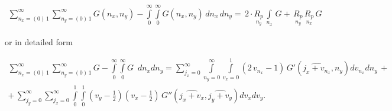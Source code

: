 \documentclass[twoside, 10pt]{article}
\begin{document}
    \begin{equation}
\begin{array}{r}
\sum\limits_{n_x=\left(0\right)\,1}^{\infty}
\sum\limits_{n_y=\left(0\right)\,1}^{\infty}
G\left(n_x, n_y\right)
-
\int\limits_{0}^{\infty}
\int\limits_{0}^{\infty}
G\left(n_x, n_y\right)\,d{n_x}\,d{n_y} =
\,2\cdot\underset{n_y}{R_{p}}\,\int\limits_{n_x}^{}\,G 
+\,\underset{n_y}{R_{p}}\,\underset{n_x}{R_{p}}\,G
\end{array}
\end{equation}

    or in detailed form

\noindent
\begin{equation}
\begin{array}{r}
\sum\limits_{n_x=\left(0\right)\,1}^{\infty}
\sum\limits_{n_y=\left(0\right)\,1}^{\infty}
G%
-
\int\limits_{0}^{\infty}
\int\limits_{0}^{\infty}
G%
\,\,\, d{n_x} d{n_y}  =
{\sum\limits_{j_{x}=0}^{\infty} \int\limits_{n_{y}=0}^{\infty} \int\limits_{v_x=0}^{1}  {\left(2 \, v_{n_{x}} - 1\right)}\, G'\left(\widehat{j_{x} + v_{n_{x}}}, n_{y}\right) {d v_{n_{x}}} {d n_{y}}} \, + \\
 + \,\sum\limits_{j_{y}=0}^{\infty} \sum\limits_{j_{x}=0}^{\infty} \int\limits_{0}^{1} \int\limits_{0}^{1} {\left(v_{y} - \frac{1}{2}\right)} {\left(v_{x} - \frac{1}{2}\right)} \, G''\left(\widehat{j_{x} + v_{x}}, \widehat{j_{y} + v_{y}}\right){d v_{x}}{d v_{y}}.
\end{array}
\end{equation}
\end{document}
